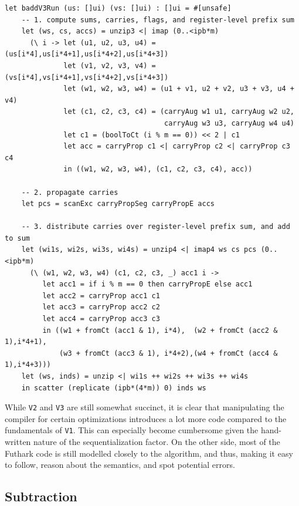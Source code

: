 \begin{lstlisting}[language=futhark,firstnumber=131,gobble=2,caption={\footnotesize Futhark \textit{badd} \texttt{V3} main function body using base \texttt{ui} and carry type \texttt{ct} from file \texttt{add.fut}.},label={futbaddv3}]
  let baddV3Run (us: []ui) (vs: []ui) : []ui = #[unsafe]
    -- 1. compute sums, carries, flags, and register-level prefix sum
    let (ws, cs, accs) = unzip3 <| imap (0..<ipb*m)
      (\ i -> let (u1, u2, u3, u4) = (us[i*4],us[i*4+1],us[i*4+2],us[i*4+3])
              let (v1, v2, v3, v4) = (vs[i*4],vs[i*4+1],vs[i*4+2],vs[i*4+3])
              let (w1, w2, w3, w4) = (u1 + v1, u2 + v2, u3 + v3, u4 + v4)
              let (c1, c2, c3, c4) = (carryAug w1 u1, carryAug w2 u2,
                                      carryAug w3 u3, carryAug w4 u4)
              let c1 = (boolToCt (i % m == 0)) << 2 | c1
              let acc = carryProp c1 <| carryProp c2 <| carryProp c3 c4
              in ((w1, w2, w3, w4), (c1, c2, c3, c4), acc))

    -- 2. propagate carries
    let pcs = scanExc carryPropSeg carryPropE accs

    -- 3. distribute carries over register-level prefix sum, and add to sum
    let (wi1s, wi2s, wi3s, wi4s) = unzip4 <| imap4 ws cs pcs (0..<ipb*m)
      (\ (w1, w2, w3, w4) (c1, c2, c3, _) acc1 i ->
         let acc1 = if i % m == 0 then carryPropE else acc1
         let acc2 = carryProp acc1 c1
         let acc3 = carryProp acc2 c2
         let acc4 = carryProp acc3 c3
         in ((w1 + fromCt (acc1 & 1), i*4),  (w2 + fromCt (acc2 & 1),i*4+1),
             (w3 + fromCt (acc3 & 1), i*4+2),(w4 + fromCt (acc4 & 1),i*4+3)))
    let (ws, inds) = unzip <| wi1s ++ wi2s ++ wi3s ++ wi4s
    in scatter (replicate (ipb*(4*m)) 0) inds ws
\end{lstlisting}

While \texttt{V2} and \texttt{V3} are still somewhat succinct, it is clear that
manipulating the compiler for certain optimizations introduces a lot more code
compared to the fundamentals of \texttt{V1}. This can especially become
cumbersome given the hand-written nature of the sequentialization factor. On the
other side, most of the Futhark code is still modelled closely to the algorithm,
and thus, making it easy to follow, reason about the semantics, and spot
potential errors.


\subsection{Subtraction}
\label{subsec:sub}


